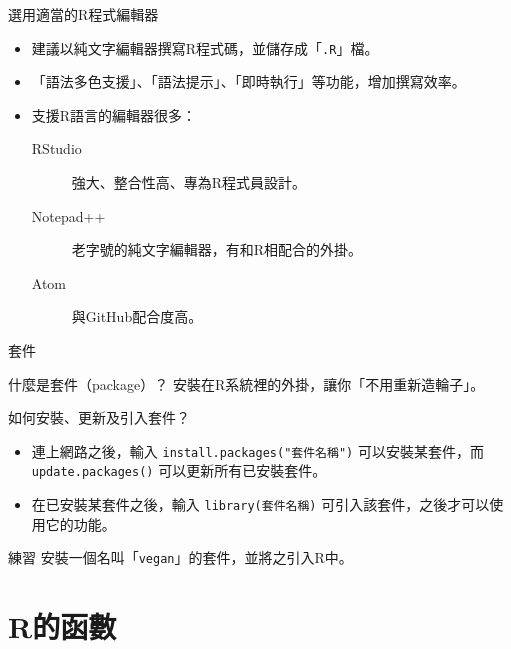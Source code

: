 \documentclass[12pt]{beamer}
\begin{document}
\begin{frame}[fragile]{選用適當的R程式編輯器}
\begin{itemize}
\item 建議以純文字編輯器撰寫R程式碼，並儲存成「\verb+.R+」檔。
\item 「語法多色支援」、「語法提示」、「即時執行」等功能，增加撰寫效率。
\item 支援R語言的編輯器很多：
\begin{description}
	\item [RStudio] 強大、整合性高、專為R程式員設計。
	\item [Notepad++] 老字號的純文字編輯器，有和R相配合的外掛。
	\item [Atom] 與GitHub配合度高。
\end{description}
\end{itemize}
\end{frame}


\begin{frame}[fragile]{套件}
\begin{block}{什麼是套件（package）？}
安裝在R系統裡的外掛，讓你「不用重新造輪子」。
\end{block}

\begin{block}{如何安裝、更新及引入套件？}
\begin{itemize}
\item 連上網路之後，輸入
\verb+install.packages("套件名稱")+
可以安裝某套件，而
\verb+update.packages()+
可以更新所有已安裝套件。

\item 在已安裝某套件之後，輸入
\verb+library(套件名稱)+
可引入該套件，之後才可以使用它的功能。
\end{itemize}
\end{block}

\begin{block}{練習}
安裝一個名叫「\verb+vegan+」的套件，並將之引入R中。
\end{block}

\end{frame}

\section{R的函數}\subsection{}
\end{document}
